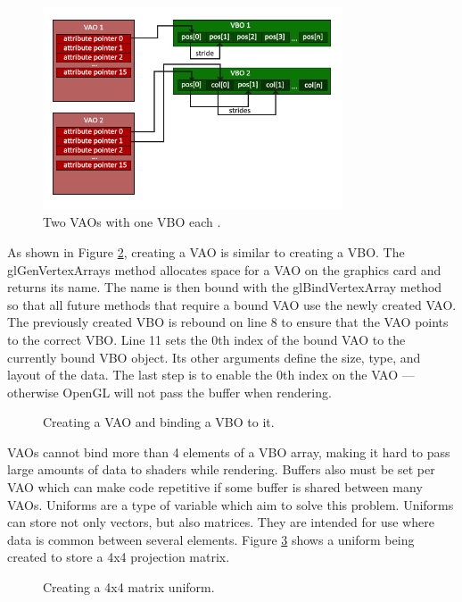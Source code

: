 \documentclass{article}
\begin{document}
\begin{figure}[h]
    \centering
	\includegraphics[height=6cm]{vao}
	\caption{Two VAOs with one VBO each \cite{devries2019}.}
	\label{fig:vbo-vao-ebo}
\end{figure}

As shown in Figure \ref{fig:create-vao}, creating a VAO is similar to creating a VBO. The glGenVertexArrays method allocates space for a VAO on the graphics card and returns its name. The name is then bound with the glBindVertexArray method so that all future methods that require a bound VAO use the newly created VAO. The previously created VBO is rebound on line 8 to ensure that the VAO points to the correct VBO. Line 11 sets the 0th index of the bound VAO to the currently bound VBO object. Its other arguments define the size, type, and layout of the data. The last step is to enable the 0th index on the VAO --- otherwise OpenGL will not pass the buffer when rendering.

\begin{figure}[h]
	
	\caption{Creating a VAO and binding a VBO to it.}
	\label{fig:create-vao}
\end{figure}

VAOs cannot bind more than 4 elements of a VBO array, making it hard to pass large amounts of data to shaders while rendering. Buffers also must be set per VAO which can make code repetitive if some buffer is shared between many VAOs. Uniforms are a type of variable which aim to solve this problem. Uniforms can store not only vectors, but also matrices. They are intended for use where data is common between several elements. Figure \ref{fig:matrix-uniform} shows a uniform being created to store a 4x4 projection matrix.

\begin{figure}[h]
	
	\caption{Creating a 4x4 matrix uniform.}
	\label{fig:matrix-uniform}
\end{figure}
\end{document}
